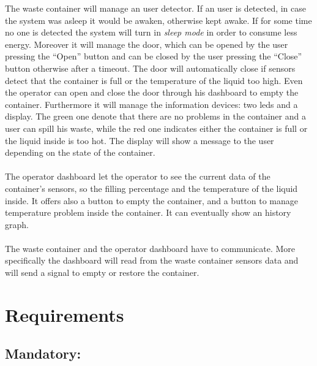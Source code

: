 \documentclass[a4paper,12pt]{report}
\begin{document}
        The waste container will manage an user detector. If an user is detected, in case the system was asleep it would be awaken, otherwise kept awake. If for some time no one is detected the system will turn in \textit{sleep mode} in order to consume less energy.
        Moreover it will manage the door, which can be opened by the user pressing the ``Open'' button and can be closed by the user pressing the ``Close'' button otherwise after a timeout. The door will automatically close if sensors detect that the container is full or the temperature of the liquid too high. 
        Even the operator can open and close the door through his dashboard to empty the container. 
        Furthermore it will manage the information devices: two leds and a display.
        The green one denote that there are no problems in the container and a user can spill his waste, while the red one indicates either the container is full or the liquid inside is too hot. 
        The display will show a message to the user depending on the state of the container.\\\\
        The operator dashboard let the operator to see the current data of the container's sensors, so the filling percentage and the temperature of the liquid inside. It offers also a button to empty the container, and a button to manage temperature problem inside the container. It can eventually show an history graph.\\\\
        The waste container and the operator dashboard have to communicate. More specifically the dashboard will read from the waste container sensors data and will send a signal to empty or restore the container. 
            
    \section{Requirements}

        \subsection{Mandatory:}
\end{document}

